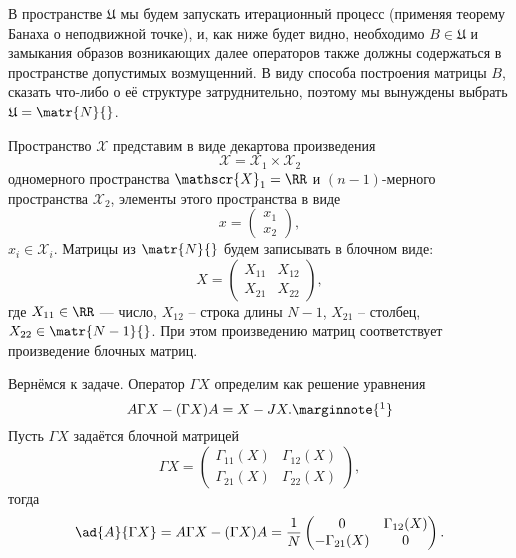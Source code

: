 В пространстве \( \mathfrak U \)
мы будем запускать итерационный процесс (применяя теорему Банаха о неподвижной точке),
и, как ниже будет видно, необходимо \( B \in \mathfrak U \)
и замыкания образов возникающих далее операторов также
должны содержаться в
пространстве допустимых возмущенний.
В виду способа построения матрицы \( B \), сказать что-либо о её структуре затруднительно,
поэтому мы вынуждены выбрать \( \mathfrak U = \matr{N}{}\).

Пространство \( \mathscr{X} \) представим в виде
декартова произведения
\[ \mathscr{X} = \mathscr{X}_1\times\mathscr{X}_2 \]
одномерного пространства \( \mathscr{X}_1=\RR \)
и \((n-1)\)-мерного пространства \( \mathscr{X}_2 \),
элементы этого пространства в виде
\[ x=\begin{pmatrix}x_1\\x_2\end{pmatrix}, \]
\( x_i\in\mathscr{X}_i \).
Матрицы из \( \matr{N}{} \) будем записывать
в блочном виде:
\[
    X = \begin{pmatrix}
    X_{11} & X_{12} \\
    X_{21} & X_{22}
    \end{pmatrix},
    \]
где \( X_{11}\in\RR \) --- число,
    \( X_{12} \) -- строка длины \( N-1 \),
    \( X_{21} \) -- столбец,
    \( X_{22} \in \matr{N-1}{} \).
При этом произведению матриц соответствует произведение блочных матриц. 

Вернёмся к задаче.
Оператор \( \Gamma X \) определим как решение уравнения
\[
    A\Gamma X - (\Gamma X) A = X - JX.
    \marginnote{
        \footnotemark}
    \]
Пусть  \( \Gamma X \) задаётся блочной матрицей
\[ \Gamma X =
\begin{pmatrix}
    \Gamma_{11}(X) & \Gamma_{12}(X) \\
    \Gamma_{21}(X) & \Gamma_{22}(X)
\end{pmatrix}, \]
тогда
\[
    \ad{A}{\Gamma X} = A \Gamma X - (\Gamma X) A =
    \frac{1}{N}
\begin{pmatrix}
    0               & \Gamma_{12}(X) \\
    -\Gamma_{21}(X) & 0             
\end{pmatrix}
    . \]


